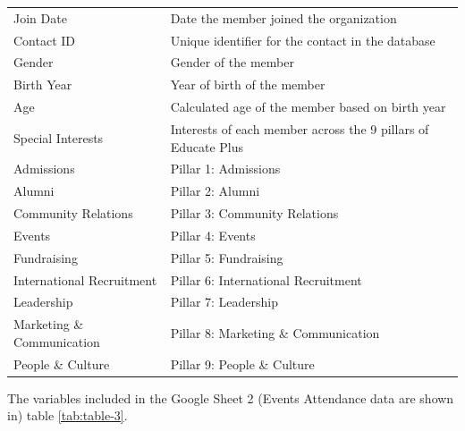 \documentclass[11pt,a4paper,]{article}
\begin{document}
\begin{longtable}[t]{l>{\raggedright\arraybackslash}p{10cm}}
Join Date & Date the member joined the organization\\
\addlinespace
Contact ID & Unique identifier for the contact in the database\\
Gender & Gender of the member\\
Birth Year & Year of birth of the member\\
Age & Calculated age of the member based on birth year\\
Special Interests & Interests of each member across the 9 pillars of Educate Plus\\
\addlinespace
Admissions & Pillar 1: Admissions\\
Alumni & Pillar 2: Alumni\\
Community Relations & Pillar 3: Community Relations\\
Events & Pillar 4: Events\\
Fundraising & Pillar 5: Fundraising\\
\addlinespace
International Recruitment & Pillar 6: International Recruitment\\
Leadership & Pillar 7: Leadership\\
Marketing \& Communication & Pillar 8: Marketing \& Communication\\
People \& Culture & Pillar 9: People \& Culture\\*
\end{longtable}

The variables included in the Google Sheet 2 (Events Attendance data are shown in) table \ref{tab:table-3}.
\end{document}
